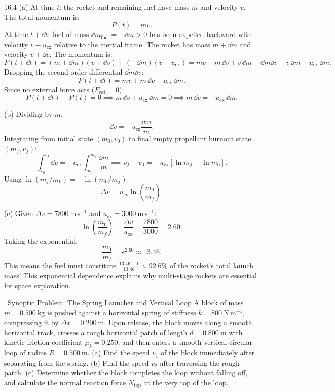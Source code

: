 \begin{tabletworkspace}[5.5cm]
\end{tabletworkspace}

\begin{solution}{16.4}
(a) At time $t$: the rocket and remaining fuel have mass $m$ and velocity $v$.
The total momentum is:
\[
P(t) = mv.
\]
At time $t + \dd t$: fuel of mass $\dd m_{\text{fuel}} = -\dd m > 0$ has been expelled backward with velocity $v - u_{\text{ex}}$ relative to the inertial frame. The rocket has mass $m + \dd m$ and velocity $v + \dd v$.
The momentum is:
\[
P(t + \dd t) = (m + \dd m)(v + \dd v) + (-\dd m)(v - u_{\text{ex}}) = mv + m\,\dd v + v\,\dd m + \dd m\dd v - v\,\dd m + u_{\text{ex}}\,\dd m.
\]
Dropping the second-order differential $\dd m\dd v$:
\[
P(t + \dd t) = mv + m\,\dd v + u_{\text{ex}}\,\dd m.
\]
Since no external force acts ($F_{\text{ext}} = 0$):
\[
P(t + \dd t) - P(t) = 0 \implies m\,\dd v + u_{\text{ex}}\,\dd m = 0 \implies \boxed{m\,\dd v = -u_{\text{ex}}\,\dd m.}
\]

(b) Dividing by $m$:
\[
\dd v = -u_{\text{ex}}\frac{\dd m}{m}.
\]
Integrating from initial state $(m_0, v_0)$ to final empty propellant burnout state $(m_f, v_f)$:
\[
\int_{v_0}^{v_f} \dd v = -u_{\text{ex}}\int_{m_0}^{m_f} \frac{\dd m}{m} \implies v_f - v_0 = -u_{\text{ex}}\left[ \ln m_f - \ln m_0 \right].
\]
Using $\ln(m_f/m_0) = -\ln(m_0/m_f)$:
\[
\boxed{\Delta v = u_{\text{ex}}\ln\left(\frac{m_0}{m_f}\right).}
\]

(c) Given $\Delta v = 7800\ \mathrm{m\,s^{-1}}$ and $u_{\text{ex}} = 3000\ \mathrm{m\,s^{-1}}$:
\[
\ln\left(\frac{m_0}{m_f}\right) = \frac{\Delta v}{u_{\text{ex}}} = \frac{7800}{3000} = 2.60.
\]
Taking the exponential:
\[
\frac{m_0}{m_f} = e^{2.60} \approx \mathbf{13.46.}
\]
This means the fuel must constitute $\frac{13.46 - 1}{13.46} \approx \mathbf{92.6\%}$ of the rocket's total launch mass! This exponential dependence explains why multi-stage rockets are essential for space exploration.
\end{solution}

\begin{exercise}{\mastery\ Synoptic Problem: The Spring Launcher and Vertical Loop}
A block of mass $m=0.500\ \mathrm{kg}$ is pushed against a horizontal spring of stiffness $k=800\ \mathrm{N\,m^{-1}}$, compressing it by $\Delta x = 0.200\ \mathrm{m}$.
Upon release, the block moves along a smooth horizontal track, crosses a rough horizontal patch of length $d=0.800\ \mathrm{m}$ with kinetic friction coefficient $\mu_k = 0.250$, and then enters a smooth vertical circular loop of radius $R = 0.500\ \mathrm{m}$.
(a) Find the speed $v_1$ of the block immediately after separating from the spring.
(b) Find the speed $v_2$ after traversing the rough patch.
(c) Determine whether the block completes the loop without falling off, and calculate the normal reaction force $N_{\text{top}}$ at the very top of the loop.
\end{exercise}

